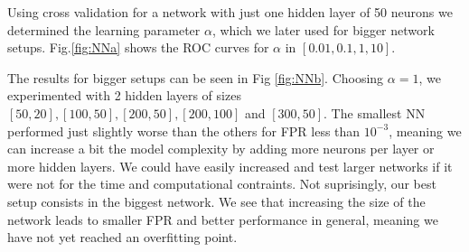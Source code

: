 Using cross validation for a network with just one hidden layer of 50 neurons we determined the learning parameter $\alpha$, which we later used for bigger network setups. Fig.\ref{fig:NNa}  shows the ROC curves for $\alpha$ in  $[0.01,0.1,1,10]$.

The results for bigger setups can be seen in Fig \ref{fig:NNb}. Choosing $\alpha=1$, we experimented with 2 hidden layers of sizes $[50,20],[100,50],[200,50],[200,100]$ and $[300,50]$. The smallest NN performed just slightly worse than the others for FPR less than $10^{-3}$, meaning we  can increase a bit the model complexity by adding more neurons per layer or more hidden layers.  We could have easily increased and test larger networks if it were not for the time and computational contraints. Not suprisingly, our best setup consists in the biggest network. We see that increasing the size of the network leads to smaller FPR and better performance in general, meaning we have not yet reached an overfitting point.

